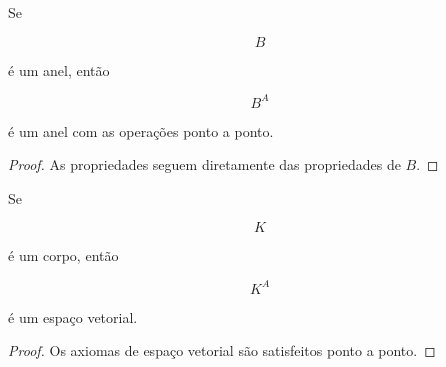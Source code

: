 \documentclass[../../main]{subfiles}
\begin{document}
\begin{prop}
	\label{prop:matematica:funcoes:operacoes:anel}

	Se

	\[
		B
	\]

	é um anel, então

	\[
		B^A
	\]

	é um anel com as operações ponto a ponto.

\end{prop}

\begin{proof}

	As propriedades seguem diretamente das propriedades de \(B\).

\end{proof}

\begin{prop}
	\label{prop:matematica:funcoes:operacoes:espaco-vetorial}

	Se

	\[
		K
	\]

	é um corpo, então

	\[
		K^A
	\]

	é um espaço vetorial.

\end{prop}

\begin{proof}

	Os axiomas de espaço vetorial são satisfeitos ponto a ponto.

\end{proof}
\end{document}

